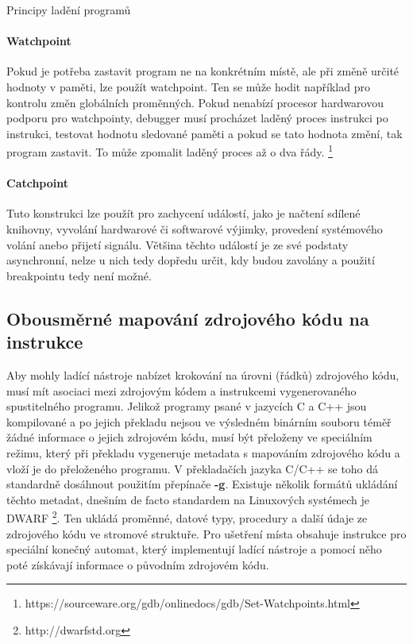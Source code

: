 \documentclass[czech,bachelor,male,python,dept460,hidelinks]{diploma}						%
\begin{document}
\begin{section}{Principy ladění programů}
		\paragraph*{Watchpoint}
			Pokud je potřeba zastavit program ne na konkrétním místě, ale při změně určité hodnoty v paměti, lze použít watchpoint. Ten se může hodit například pro
			kontrolu změn globálních proměnných. Pokud nenabízí procesor hardwarovou podporu pro watchpointy, debugger musí procházet laděný proces instrukci po
			instrukci, testovat hodnotu sledované paměti a pokud se tato hodnota změní, tak program zastavit. To může zpomalit laděný proces až o
			dva řády. \footnote{https://sourceware.org/gdb/onlinedocs/gdb/Set-Watchpoints.html}
		\paragraph*{Catchpoint}
			Tuto konstrukci lze použít pro zachycení událostí, jako je načtení sdílené knihovny, vyvolání hardwarové či softwarové výjimky, provedení
			systémového volání anebo přijetí signálu. Většina těchto událostí je ze své podstaty asynchronní, nelze u nich tedy dopředu určit, kdy budou zavolány
			a použití breakpointu tedy není možné.	
		
	\subsection{Obousměrné mapování zdrojového kódu na instrukce}
		Aby mohly ladící nástroje nabízet krokování na úrovni (řádků) zdrojového kódu, musí mít asociaci mezi zdrojovým kódem a instrukcemi vygenerovaného
		spustitelného programu. Jelikož programy psané v jazycích C a C++ jsou kompilované a po jejich překladu nejsou
		ve výsledném binárním souboru téměř žádné informace o jejich zdrojovém kódu, musí být přeloženy ve speciálním režimu, který při překladu vygeneruje
		metadata s mapováním zdrojového kódu a vloží je do přeloženého programu. V překladačích jazyka C/C++ se toho dá standardně dosáhnout použitím
		přepínače \textbf{-g}. Existuje několik formátů ukládání těchto metadat, dnešním de facto standardem na Linuxových systémech je DWARF
		\footnote{http://dwarfstd.org}. Ten ukládá proměnné, datové typy, procedury a další údaje ze zdrojového kódu ve stromové struktuře.
		Pro ušetření místa obsahuje instrukce pro speciální konečný automat, který implementují ladící nástroje a pomocí něho poté získávají
		informace o původním zdrojovém kódu.
		

\end{section}
\end{document}
